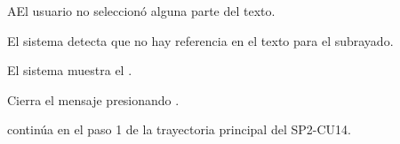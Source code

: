 \label{SP2-CU14-A}
\begin{UCtrayectoriaA}{A}{El usuario no seleccionó alguna parte del texto.}

	\UCpaso El sistema detecta que no hay referencia en el texto para el subrayado.

  \UCpaso El sistema muestra el .

  \UCpaso[\UCactor] Cierra el mensaje presionando .

  \UCpaso continúa en el paso 1 de la trayectoria principal del SP2-CU14.
\end{UCtrayectoriaA}
